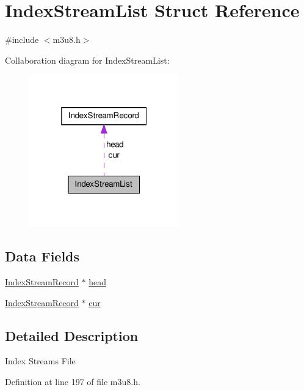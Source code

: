 \hypertarget{struct_index_stream_list}{\section{\-Index\-Stream\-List \-Struct \-Reference}
\label{struct_index_stream_list}
}


{\ttfamily \#include $<$m3u8.\-h$>$}



\-Collaboration diagram for \-Index\-Stream\-List\-:
\nopagebreak
\begin{figure}[H]
\begin{center}
\leavevmode
\includegraphics[width=184pt]{struct_index_stream_list__coll__graph}
\end{center}
\end{figure}
\subsection*{\-Data \-Fields}
\begin{DoxyCompactItemize}
\item 
\hyperlink{struct_index_stream_record}{\-Index\-Stream\-Record} $\ast$ \hyperlink{struct_index_stream_list_aeca35d85f7eaa7b959214594bd625c0d}{head}
\item 
\hyperlink{struct_index_stream_record}{\-Index\-Stream\-Record} $\ast$ \hyperlink{struct_index_stream_list_a57743db12937a74df7a81d3286c74d55}{cur}
\end{DoxyCompactItemize}


\subsection{\-Detailed \-Description}
\-Index \-Streams \-File 

\-Definition at line 197 of file m3u8.\-h.



